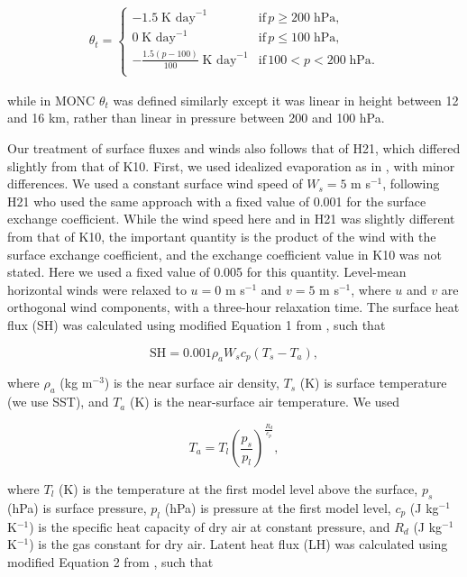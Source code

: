\documentclass[draft]{agujournal2019}
\begin{document}
\begin{align}
 \theta_t = \begin{cases}
    -1.5\; \textrm{K day}^{-1} & \textrm{if}\, p \geq 200\; \textrm{hPa}, \\
    0\; \textrm{K day}^{-1} & \textrm{if}\, p \leq 100\; \textrm{hPa}, \\
    -\frac{1.5 (p-100)}{100}\; \textrm{K day}^{-1} & \textrm{if}\, 
    100 < p < 200\; \textrm{hPa}. \\
 \end{cases}
 \label{eq:temp_tendancy}
\end{align}

\noindent while in MONC $\theta_t$ was defined similarly except it was linear in
height between 12 and 16 km, rather than linear in pressure between 200 and 100
hPa.

Our treatment of surface fluxes and winds also follows that of H21, which
differed slightly from that of K10. First, we used idealized evaporation as in
, with minor differences. We used a constant surface wind
speed of $W_s = 5$ m s$^{-1}$, following H21 who used the same approach with a
fixed value of 0.001 for the surface exchange coefficient. While the wind speed
here and in H21 was slightly different from that of K10, the important quantity
is the product of the wind with the surface exchange coefficient, and the
exchange coefficient value in K10 was not stated. Here we used a fixed value of
0.005 for this quantity. Level-mean horizontal winds were relaxed to $u = 0$ m
s$^{-1}$ and $v = 5$ m s$^{-1}$, where $u$ and $v$ are orthogonal wind
components, with a three-hour relaxation time. The surface heat flux (SH) was
calculated using modified Equation 1 from , such that

\begin{equation}
\textrm{SH} = 0.001 \rho_a W_s c_p (T_s - T_a),
\end{equation}

\noindent where $\rho_a$ (kg m$^{-3}$) is the near surface air density, $T_s$
(K) is surface temperature (we use SST), and $T_a$ (K) is the near-surface air
temperature. We used 

\begin{equation}
T_a = T_l \left(\frac{p_s}{p_l}\right)^{\frac{R_d}{c_p}},
\end{equation}

\noindent where $T_l$ (K) is the temperature at the first model level above the
surface, $p_s$ (hPa) is surface pressure, $p_l$ (hPa) is pressure at the first
model level, $c_p$ (J kg$^{-1}$ K$^{-1}$) is the specific heat capacity of dry
air at constant pressure, and $R_d$ (J kg$^{-1}$ K$^{-1}$) is the gas constant
for dry air. Latent heat flux (LH) was calculated using modified Equation 2 from
, such that
\end{document}
